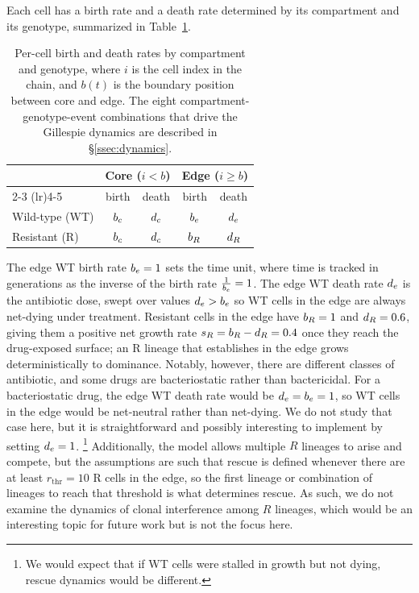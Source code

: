 Each cell has a birth rate and a death rate determined by its compartment and its genotype, summarized in Table~\ref{tab:rates}.

\begin{table}[htbp]
\centering
\small
\begin{tabular}{lcccc}
\toprule
                & \multicolumn{2}{c}{Core ($i < b$)} & \multicolumn{2}{c}{Edge ($i \ge b$)} \\
\cmidrule(lr){2-3} \cmidrule(lr){4-5}
                & birth        & death        & birth        & death \\
\midrule
Wild-type (WT)  & $b_c$     & $d_c$     & $b_e$     & $d_e$ \\
Resistant (R)   & $b_c$     & $d_c$     & $b_R$        & $d_R$ \\
\bottomrule
\end{tabular}
\caption{Per-cell birth and death rates by compartment and genotype, where $i$ is the cell index in the chain, and $b(t)$ is the boundary position between core and edge. The eight compartment-genotype-event combinations that drive the Gillespie dynamics are described in \S\ref{ssec:dynamics}.}
\label{tab:rates}
\end{table}

The edge WT birth rate $b_e = 1$ sets the time unit, where time is tracked in generations as the inverse of the birth rate $\frac{1}{b_e} = 1$. The edge WT death rate $d_e$ is the antibiotic dose, swept over values $d_e > b_e$ so WT cells in the edge are always net-dying under treatment. Resistant cells in the edge have $b_R = 1$ and $d_R = 0.6$, giving them a positive net growth rate $s_R = b_R - d_R = 0.4$ once they reach the drug-exposed surface; an R lineage that establishes in the edge grows deterministically to dominance. Notably, however, there are different classes of antibiotic, and some drugs are bacteriostatic rather than bactericidal. For a bacteriostatic drug, the edge WT death rate would be $d_e = b_e = 1$, so WT cells in the edge would be net-neutral rather than net-dying. We do not study that case here, but it is straightforward and possibly interesting to implement by setting $d_e = 1$. \footnote{We would expect that if WT cells were stalled in growth but not dying, rescue dynamics would be different.} Additionally, the model allows multiple $R$ lineages to arise and compete, but the assumptions are such that rescue is defined whenever there are at least $r_{\mathrm{thr}} = 10$ R cells in the edge, so the first lineage or combination of lineages to reach that threshold is what determines rescue. As such, we do not examine the dynamics of clonal interference among $R$ lineages, which would be an interesting topic for future work but is not the focus here.

